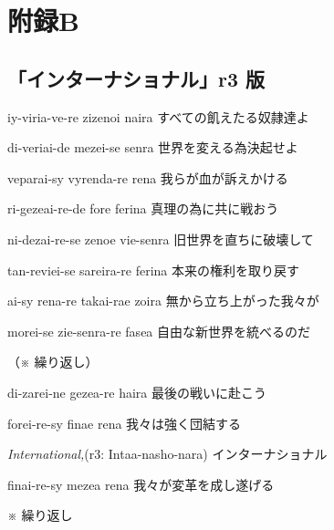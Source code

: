 \chapter{附録B}

\section{「インターナショナル」r3 版}

\lyric
{iy-viria-ve-re zizenoi naira}
{すべての飢えたる奴隷達よ}

\lyric
{di-veriai-de mezei-se senra}
{世界を変える為決起せよ}

\lyric
{veparai-sy vyrenda-re rena}
{我らが血が訴えかける}

\lyric
{ri-gezeai-re-de fore ferina}
{真理の為に共に戦おう}

\lyric
{ni-dezai-re-se zenoe vie-senra}
{旧世界を直ちに破壊して}

\lyric
{tan-reviei-se sareira-re ferina}
{本来の権利を取り戻す}

\lyric
{ai-sy rena-re takai-rae zoira}
{無から立ち上がった我々が}

\lyric
{morei-se zie-senra-re fasea}
{自由な新世界を統べるのだ}

（※ 繰り返し）

\lyric
{di-zarei-ne gezea-re haira}
{最後の戦いに赴こう}

\lyric
{forei-re-sy finae rena}
{我々は強く団結する}

\lyric
{\emph{International,}(r3: Intaa-nasho-nara)}
{インターナショナル}

\lyric
{finai-re-sy mezea rena}
{我々が変革を成し遂げる}

※ 繰り返し